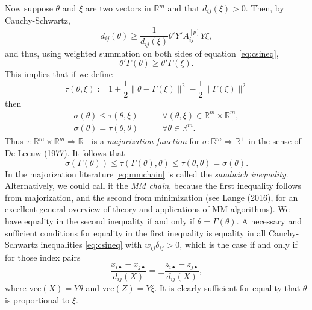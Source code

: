 \documentclass[
  12pt,
]{article}
\begin{document}
Now suppose \(\theta\) and \(\xi\) are two vectors in \(\mathbb{R}^m\) and that \(d_{ij}(\xi)>0\). Then, by Cauchy-Schwartz,
\begin{equation}
d_{ij}(\theta)\geq\frac{1}{d_{ij}(\xi)}\theta'Y'A_{ij}^{[p]}Y\xi,
\label{eq:csineq}
\end{equation}
and thus, using weighted summation on both sides of equation \eqref{eq:csineq},
\begin{equation}
\theta'\Gamma(\theta)\geq\theta'\Gamma(\xi).
\label{eq:smacs}
\end{equation}
This implies that if we define
\begin{equation}
\tau(\theta,\xi):=1+\frac12\|\theta-\Gamma(\xi)\|^2-\frac12\|\Gamma(\xi)\|^2
\label{eq:etadef}
\end{equation}
then
\begin{align}
\sigma(\theta)\leq\tau(\theta,\xi)&\qquad\forall(\theta,\xi)\in\mathbb{R}^m\times\mathbb{R}^m,\\
\sigma(\theta)=\tau(\theta,\theta)&\qquad\forall\theta\in\mathbb{R}^m.
\end{align}
Thus \(\tau:\mathbb{R}^m\times\mathbb{R}^m\Rightarrow\mathbb{R}^+\) is a \emph{majorization function} for
\(\sigma:\mathbb{R}^m\Rightarrow\mathbb{R}^+\) in the sense of De Leeuw (1977). It follows that
\begin{equation}
\sigma(\Gamma(\theta))\leq\tau(\Gamma(\theta),\theta)\leq\tau(\theta,\theta)=\sigma(\theta).
\label{eq:mmchain}
\end{equation}
In the majorization literature \eqref{eq:mmchain} is called the \emph{sandwich inequality}. Alternatively, we could call it the \emph{MM chain}, because the first inequality follows from majorization, and the second from minimization (see Lange (2016), for an excellent general overview of theory and applications of MM algorithms). We have equality in the second inequality if and only if \(\theta=\Gamma(\theta)\). A necessary and sufficient conditions for equality in the first inequality is equality in all Cauchy-Schwartz inequalities \eqref{eq:csineq} with \(w_{ij}\delta_{ij}>0\), which is the case if and only if for those index pairs
\begin{equation}
\frac{x_{i\bullet}-x_{j\bullet }}{d_{ij}(X)}=\pm\frac{z_{i\bullet}-z_{j\bullet}}{d_{ij}(X)},
\label{eq:equality}
\end{equation}
where \(\text{vec}(X)=Y\theta\) and \(\text{vec}(Z)=Y\xi\).
It is clearly sufficient for equality that \(\theta\) is proportional to \(\xi\).
\end{document}
